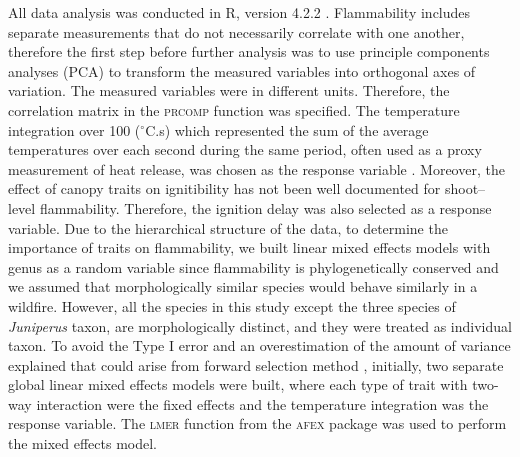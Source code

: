 \documentclass{bmcart}
\newcommand{\pkg}[1]{\textsc{#1}}
\begin{document}
All data analysis was conducted in R, version 4.2.2 \citep{R}. 
Flammability includes separate measurements that do not necessarily correlate with one another, therefore the first step before further analysis was to use principle components analyses (PCA) to transform the measured variables into orthogonal axes of variation. The measured variables were in different units. Therefore, the correlation matrix in the \pkg{prcomp} function was specified. %
The temperature integration over 100 ($^{\circ}$C.s) which represented the sum of the average temperatures over each second during the same period, often used as a proxy measurement of heat release, was chosen as the response variable \citep{gao2018grass, mcgranahan2020inconvenient}. Moreover, the effect of canopy traits on ignitibility has not been well documented for shoot--level flammability. Therefore, the ignition delay was also selected as a response variable. Due to the hierarchical structure of the data, to determine the importance of traits on flammability, we built linear mixed effects models with genus as a random variable since flammability is phylogenetically conserved \citep{cui2020shoot} and we assumed that morphologically similar species would behave similarly in a wildfire. However, all the species in this study except the three species of \emph{Juniperus} taxon,
are morphologically distinct, and they were treated as individual taxon. To avoid the  Type I error and an overestimation of the amount of variance explained that could arise from forward selection method \citep{blanchet2008forward}, initially, two separate global linear mixed effects models were built, where each type of trait with two-way interaction were the fixed effects and the temperature integration was the response variable. The \pkg{lmer} function from the \pkg{afex} package \citep{singmann2015packageafex,afexluke2017evaluating} was used to perform the mixed effects model. 
\end{document}
